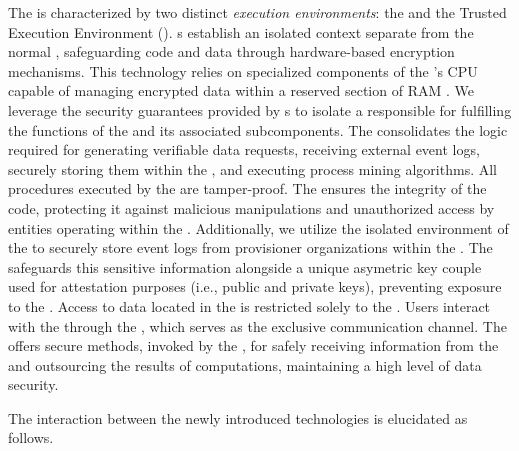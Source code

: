 The  is characterized by two distinct \textit{execution environments}: the  and the Trusted Execution Environment (). s establish an isolated context separate from the normal , safeguarding code and data through hardware-based encryption mechanisms. This technology relies on specialized components of the 's CPU capable of managing encrypted data within a reserved section of RAM \cite{TEEHERE}. We leverage the security guarantees provided by s to isolate a  responsible for fulfilling the functions of the  and its associated subcomponents. The  consolidates the logic required for generating verifiable data requests, receiving external event logs, securely storing them within the , and executing process mining algorithms. All procedures executed by the  are tamper-proof. The  ensures the integrity of the  code, protecting it against malicious manipulations and unauthorized access by entities operating within the . Additionally, we utilize the isolated environment of the  to securely store event logs from provisioner organizations within the . The  safeguards this sensitive information alongside a unique asymetric key couple used for attestation purposes (i.e., public and private keys), preventing exposure to the . Access to data located in the  is restricted solely to the . Users interact with the  through the , which serves as the exclusive communication channel. The  offers secure methods, invoked by the , for safely receiving information from the  and outsourcing the results of computations, maintaining a high level of data security.

The interaction between the newly introduced technologies is elucidated as follows.


